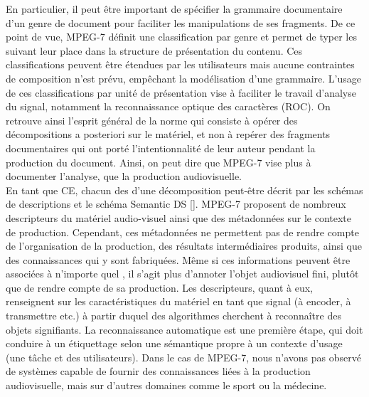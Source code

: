 En particulier, il peut être important de spécifier la grammaire documentaire d'un genre de document pour faciliter les manipulations de ses fragments. 
De ce point de vue, MPEG-7 définit une classification par genre et permet de typer les  suivant leur place dans la structure de présentation du contenu.
Ces classifications peuvent être étendues par les utilisateurs mais aucune contraintes de composition n'est prévu, empêchant la modélisation d'une grammaire.
L'usage de ces classifications par unité de présentation vise à faciliter le travail d'analyse du signal, notamment la reconnaissance optique des caractères (ROC).
On retrouve ainsi l'esprit général de la norme qui consiste à opérer des décompositions a posteriori sur le matériel, et non à repérer des fragments documentaires qui ont porté l'intentionnalité de leur auteur pendant la production du document.
Ainsi, on peut dire que MPEG-7 vise plus à documenter l'analyse, que la production audiovisuelle.\\


En tant que CE, chacun des  d'une décomposition peut-être décrit par les schémas de descriptions et le schéma Semantic DS [].
MPEG-7 proposent de nombreux descripteurs du matériel audio-visuel ainsi que des métadonnées sur le contexte de production.
Cependant, ces métadonnées ne permettent pas de rendre compte de l'organisation de la production, des résultats intermédiaires produits, ainsi que des connaissances qui y sont fabriquées. 
Même si ces informations peuvent être associées à n'importe quel , il s'agit plus d'annoter l'objet audiovisuel fini, plutôt que de rendre compte de sa production.
Les descripteurs, quant à eux, renseignent sur les caractéristiques du matériel en tant que signal (à encoder, à transmettre etc.) à partir duquel des algorithmes cherchent à reconnaître des objets signifiants.
La reconnaissance automatique est une première étape, qui doit conduire à un étiquettage selon une sémantique propre à un contexte d'usage (une tâche et des utilisateurs).
Dans le cas de MPEG-7, nous n'avons pas observé de systèmes capable de fournir des connaissances liées à la production audiovisuelle, mais sur d'autres domaines comme le sport ou la médecine.


